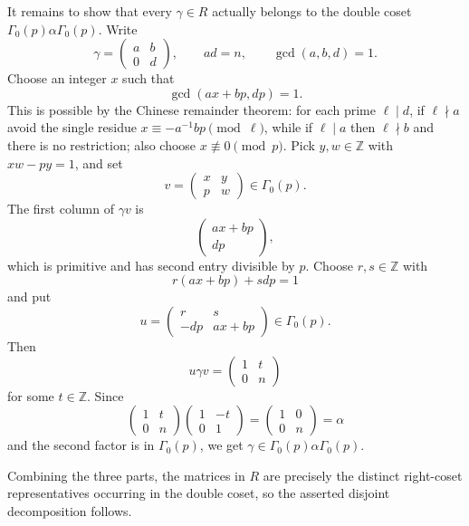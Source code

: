 \begin{solution}
It remains to show that every $\gamma\in R$ actually belongs to the double coset $\Gamma_0(p)\alpha\Gamma_0(p)$. Write
\[
\gamma=
\begin{pmatrix}
a & b\\
0 & d
\end{pmatrix},
\qquad
ad=n,
\qquad
\gcd(a,b,d)=1.
\]
Choose an integer $x$ such that
\[
\gcd(ax+bp,dp)=1.
\]
This is possible by the Chinese remainder theorem: for each prime $\ell\mid d$, if $\ell\nmid a$ avoid the single residue $x\equiv -a^{-1}bp\pmod \ell$, while if $\ell\mid a$ then $\ell\nmid b$ and there is no restriction; also choose $x\not\equiv 0\pmod p$. Pick $y,w\in \mathbb{Z}$ with $xw-py=1$, and set
\[
v=
\begin{pmatrix}
x & y\\
p & w
\end{pmatrix}
\in \Gamma_0(p).
\]
The first column of $\gamma v$ is
\[
\begin{pmatrix}
ax+bp\\
dp
\end{pmatrix},
\]
which is primitive and has second entry divisible by $p$. Choose $r,s\in \mathbb{Z}$ with
\[
r(ax+bp)+sdp=1
\]
and put
\[
u=
\begin{pmatrix}
r & s\\
-dp & ax+bp
\end{pmatrix}
\in \Gamma_0(p).
\]
Then
\[
u\gamma v=
\begin{pmatrix}
1 & t\\
0 & n
\end{pmatrix}
\]
for some $t\in \mathbb{Z}$. Since
\[
\begin{pmatrix}
1 & t\\
0 & n
\end{pmatrix}
\begin{pmatrix}
1 & -t\\
0 & 1
\end{pmatrix}
=
\begin{pmatrix}
1 & 0\\
0 & n
\end{pmatrix}
=\alpha
\]
and the second factor is in $\Gamma_0(p)$, we get $\gamma\in \Gamma_0(p)\alpha\Gamma_0(p)$.

Combining the three parts, the matrices in $R$ are precisely the distinct right-coset representatives occurring in the double coset, so the asserted disjoint decomposition follows.
\end{solution}

